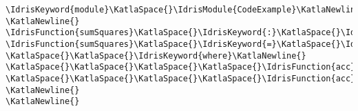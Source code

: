 \documentclass{article}
\newcommand{\KatlaNewline}            {}
\newcommand{\KatlaSpace}              { }
\newcommand{\KatlaDash}               {\string-}
\newcommand{\IdrisHlightFont}         {\ttfamily}
\newcommand{\IdrisHlightStyleData}    {}
\newcommand{\IdrisHlightStyleType}    {}
\newcommand{\IdrisHlightStyleBound}   {}
\newcommand{\IdrisHlightStyleFunction}{}
\newcommand{\IdrisHlightStyleKeyword} {\bfseries}
\newcommand{\IdrisHlightStyleModule}   {\itshape}
\newcommand{\IdrisHlightColourData}    {IndianRed1}
\newcommand{\IdrisHlightColourType}    {DeepSkyBlue3}
\newcommand{\IdrisHlightColourBound}   {DarkOrchid3}
\newcommand{\IdrisHlightColourFunction}{Chartreuse4}
\newcommand{\IdrisHlightColourKeyword} {black}
\newcommand{\IdrisHlightColourModule}   {black}
\newcommand{\RawIdrisHighlight}[3]{{\textcolor{#1}{\IdrisHlightFont#2{#3}}}}
\newcommand{\IdrisData}[1]{\RawIdrisHighlight{\IdrisHlightColourData}{\IdrisHlightStyleData}{#1}}
\newcommand{\IdrisType}[1]{\RawIdrisHighlight{\IdrisHlightColourType}{\IdrisHlightStyleType}{#1}}
\newcommand{\IdrisBound}[1]{\RawIdrisHighlight{\IdrisHlightColourBound}{\IdrisHlightStyleBound}{#1}}
\newcommand{\IdrisFunction}[1]{\RawIdrisHighlight{\IdrisHlightColourFunction}{\IdrisHlightStyleFunction}{#1}}
\newcommand{\IdrisKeyword}[1]{\RawIdrisHighlight{\IdrisHlightColourKeyword}{\IdrisHlightStyleKeyword}{#1}}
\newcommand{\IdrisModule}[1]{\RawIdrisHighlight{\IdrisHlightColourModule}{\IdrisHlightStyleModule}{#1}}
\begin{document}
\begin{Verbatim}[commandchars=\\\{\}]
\IdrisKeyword{module}\KatlaSpace{}\IdrisModule{CodeExample}\KatlaNewline{}
\KatlaNewline{}
\IdrisFunction{sumSquares}\KatlaSpace{}\IdrisKeyword{:}\KatlaSpace{}\IdrisType{Num}\KatlaSpace{}\IdrisBound{a}\KatlaSpace{}\IdrisKeyword{=>}\KatlaSpace{}\IdrisType{List}\KatlaSpace{}\IdrisBound{a}\KatlaSpace{}\IdrisKeyword{\KatlaDash{}>}\KatlaSpace{}\IdrisBound{a}\KatlaNewline{}
\IdrisFunction{sumSquares}\KatlaSpace{}\IdrisKeyword{=}\KatlaSpace{}\IdrisFunction{foldl}\KatlaSpace{}\IdrisFunction{acc}\KatlaSpace{}\IdrisData{0}\KatlaNewline{}
\KatlaSpace{}\KatlaSpace{}\IdrisKeyword{where}\KatlaNewline{}
\KatlaSpace{}\KatlaSpace{}\KatlaSpace{}\KatlaSpace{}\IdrisFunction{acc}\KatlaSpace{}\IdrisKeyword{:}\KatlaSpace{}\IdrisBound{a}\KatlaSpace{}\IdrisKeyword{\KatlaDash{}>}\KatlaSpace{}\IdrisBound{a}\KatlaSpace{}\IdrisKeyword{\KatlaDash{}>}\KatlaSpace{}\IdrisBound{a}\KatlaNewline{}
\KatlaSpace{}\KatlaSpace{}\KatlaSpace{}\KatlaSpace{}\IdrisFunction{acc}\KatlaSpace{}\IdrisBound{sum}\KatlaSpace{}\IdrisBound{v}\KatlaSpace{}\IdrisKeyword{=}\KatlaSpace{}\IdrisBound{sum}\KatlaSpace{}\IdrisFunction{+}\KatlaSpace{}\IdrisBound{v}\KatlaSpace{}\IdrisFunction{*}\KatlaSpace{}\IdrisBound{v}\KatlaNewline{}
\KatlaNewline{}
\KatlaNewline{}
\end{Verbatim}
\end{document}
